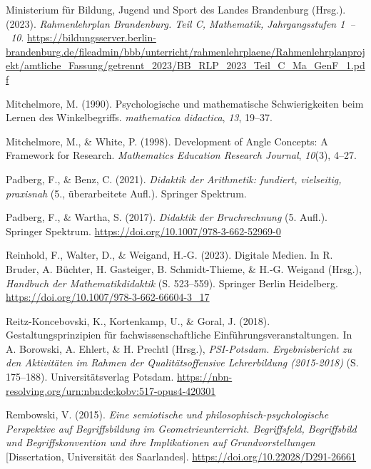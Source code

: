 \documentclass[
]{scrbook}
\newlength{\cslhangindent}
\newenvironment{CSLReferences}[2] %
 {\begin{list}{}{%
  \setlength{\itemindent}{0pt}
  \setlength{\leftmargin}{0pt}
  \setlength{\parsep}{0pt}
  \ifodd #1
   \setlength{\leftmargin}{\cslhangindent}
   \setlength{\itemindent}{-1\cslhangindent}
  \fi
  \setlength{\itemsep}{#2\baselineskip}}}
 {\end{list}}
\theoremstyle{definition}
\theoremstyle{definition}
\theoremstyle{definition}
\theoremstyle{definition}
\theoremstyle{remark}
\begin{document}
\begin{CSLReferences}{1}{0}
Ministerium für Bildung, Jugend und Sport des Landes Brandenburg (Hrsg.). (2023). \emph{Rahmenlehrplan {Brandenburg}. {Teil} {C}, {Mathematik}, {Jahrgangsstufen} 1~--~10}. \url{https://bildungsserver.berlin-brandenburg.de/fileadmin/bbb/unterricht/rahmenlehrplaene/Rahmenlehrplanprojekt/amtliche_Fassung/getrennt_2023/BB_RLP_2023_Teil_C_Ma_GenF_1.pdf}

Mitchelmore, M. (1990). Psychologische und mathematische Schwierigkeiten beim Lernen des Winkelbegriffs. \emph{mathematica didactica}, \emph{13}, 19--37.

Mitchelmore, M., \& White, P. (1998). Development of {Angle} {Concepts}: {A} {Framework} for {Research}. \emph{Mathematics Education Research Journal}, \emph{10}(3), 4--27.

Padberg, F., \& Benz, C. (2021). \emph{Didaktik der {Arithmetik}: fundiert, vielseitig, praxisnah} (5., überarbeitete Aufl.). Springer Spektrum.

Padberg, F., \& Wartha, S. (2017). \emph{Didaktik der {Bruchrechnung}} (5. Aufl.). Springer Spektrum. \url{https://doi.org/10.1007/978-3-662-52969-0}

Reinhold, F., Walter, D., \& Weigand, H.-G. (2023). Digitale {Medien}. In R. Bruder, A. Büchter, H. Gasteiger, B. Schmidt-Thieme, \& H.-G. Weigand (Hrsg.), \emph{Handbuch der {Mathematikdidaktik}} (S. 523--559). Springer Berlin Heidelberg. \url{https://doi.org/10.1007/978-3-662-66604-3_17}

Reitz-Koncebovski, K., Kortenkamp, U., \& Goral, J. (2018). Gestaltungsprinzipien für fachwissenschaftliche {Einführungsveranstaltungen}. In A. Borowski, A. Ehlert, \& H. Prechtl (Hrsg.), \emph{{PSI}-{Potsdam}. {Ergebnisbericht} zu den {Aktivitäten} im {Rahmen} der {Qualitätsoffensive} {Lehrerbildung} (2015-2018)} (S. 175--188). Universitätsverlag Potsdam. \url{https://nbn-resolving.org/urn:nbn:de:kobv:517-opus4-420301}

Rembowski, V. (2015). \emph{Eine semiotische und philosophisch-psychologische {Perspektive} auf {Begriffsbildung} im {Geometrieunterricht}. {Begriffsfeld}, {Begriffsbild} und {Begriffskonvention} und ihre {Implikationen} auf {Grundvorstellungen}} {[}Dissertation, Universität des Saarlandes{]}. \url{https://doi.org/10.22028/D291-26661}


\end{CSLReferences}
\end{document}
